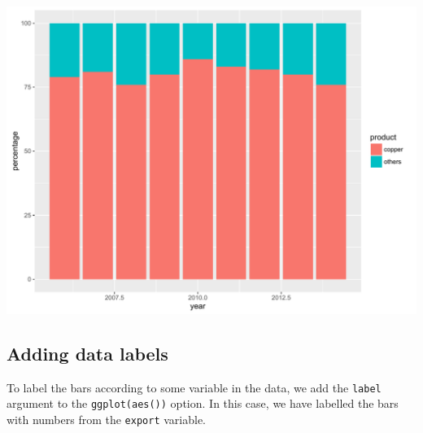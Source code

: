 \documentclass[]{article}
\newenvironment{Shaded}{\begin{snugshade}}{\end{snugshade}}
\newcommand{\KeywordTok}[1]{\textcolor[rgb]{0.13,0.29,0.53}{\textbf{{#1}}}}
\newcommand{\DataTypeTok}[1]{\textcolor[rgb]{0.13,0.29,0.53}{{#1}}}
\newcommand{\DecValTok}[1]{\textcolor[rgb]{0.00,0.00,0.81}{{#1}}}
\newcommand{\StringTok}[1]{\textcolor[rgb]{0.31,0.60,0.02}{{#1}}}
\newcommand{\NormalTok}[1]{{#1}}
\begin{document}
\begin{center}\includegraphics{0_all_posts_pdf/stacked_1-1} \end{center}

\subsection{Adding data labels}\label{adding-data-labels-1}

To label the bars according to some variable in the data, we add the
\texttt{label} argument to the \texttt{ggplot(aes())} option. In this
case, we have labelled the bars with numbers from the \texttt{export}
variable.

\begin{Shaded}
\end{Shaded}
\end{document}
